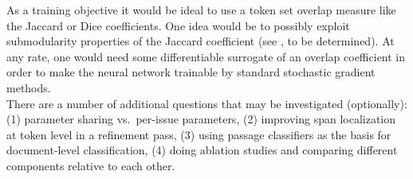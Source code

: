 \documentclass{article}
\begin{document}
As a training objective it would be ideal to use a token set overlap measure like the Jaccard or Dice coefficients. One idea would be to possibly exploit submodularity properties of the Jaccard coefficient (see \cite{berman2017optimization}, to be determined). At any rate, one would need some differentiable surrogate of an overlap coefficient in order to make the neural network trainable by standard stochastic gradient methods. \\

There are a number of additional  questions that may be investigated (optionally): (1) parameter sharing vs.~per-issue parameters, (2) improving span localization at token level in a refinement pass, (3) using passage classifiers as the basis for document-level classification, (4) doing ablation studies and comparing different components relative to each other. 



\end{document}
